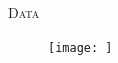 \documentclass[final,t]{beamer}
\begin{document}
\begin{frame}{}
\begin{columns}[t]
\begin{column}{.5\linewidth}
                \begin{block}{\textsc{Data}}
                    \vspace*{6mm}
                    \begin{figure}
                        \texttt{[image: ]}
                        \caption{}
                    \end{figure}
                \end{block}
            \end{column}


        \end{columns}
    \end{frame}
\end{document}
